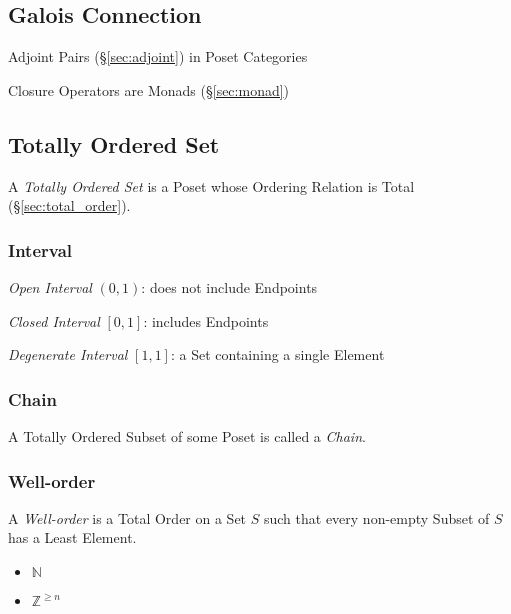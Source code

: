 \subsection{Galois Connection}\label{sec:galois_connection}

Adjoint Pairs (\S\ref{sec:adjoint}) in Poset Categories

Closure Operators are Monads (\S\ref{sec:monad})



\subsection{Totally Ordered Set}\label{sec:totally_ordered}

A \emph{Totally Ordered Set} is a Poset whose Ordering Relation is
Total (\S\ref{sec:total_order}).



\subsubsection{Interval}\label{sec:interval}

\emph{Open Interval} $(0,1)$: does not include Endpoints

\emph{Closed Interval} $[0,1]$: includes Endpoints

\emph{Degenerate Interval} $[1,1]$: a Set containing a single Element



\subsubsection{Chain}\label{sec:chain}

A Totally Ordered Subset of some Poset is called a \emph{Chain}.



\subsubsection{Well-order}\label{sec:well_order}

A \emph{Well-order} is a Total Order on a Set $S$ such that every
non-empty Subset of $S$ has a Least Element.

\begin{itemize}
  \item $\mathbb{N}$
  \item $\mathbb{Z}^{\geq n}$
\end{itemize}

